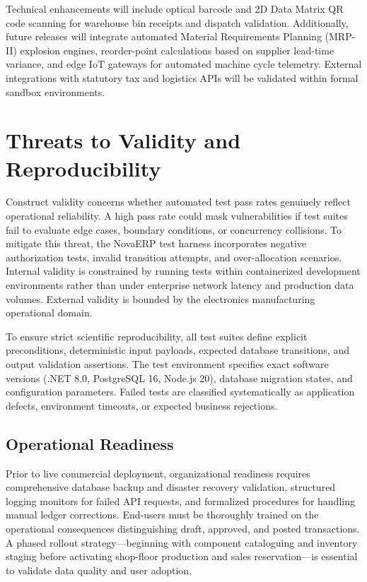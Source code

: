\documentclass[conference]{IEEEtran}
\begin{document}
Technical enhancements will include optical barcode and 2D Data Matrix QR code scanning for warehouse bin receipts and dispatch validation. Additionally, future releases will integrate automated Material Requirements Planning (MRP-II) explosion engines, reorder-point calculations based on supplier lead-time variance, and edge IoT gateways for automated machine cycle telemetry. External integrations with statutory tax and logistics APIs will be validated within formal sandbox environments.

\section{Threats to Validity and Reproducibility}
Construct validity concerns whether automated test pass rates genuinely reflect operational reliability. A high pass rate could mask vulnerabilities if test suites fail to evaluate edge cases, boundary conditions, or concurrency collisions. To mitigate this threat, the NovaERP test harness incorporates negative authorization tests, invalid transition attempts, and over-allocation scenarios. Internal validity is constrained by running tests within containerized development environments rather than under enterprise network latency and production data volumes. External validity is bounded by the electronics manufacturing operational domain.

To ensure strict scientific reproducibility, all test suites define explicit preconditions, deterministic input payloads, expected database transitions, and output validation assertions. The test environment specifies exact software versions (.NET 8.0, PostgreSQL 16, Node.js 20), database migration states, and configuration parameters. Failed tests are classified systematically as application defects, environment timeouts, or expected business rejections.

\subsection{Operational Readiness}
Prior to live commercial deployment, organizational readiness requires comprehensive database backup and disaster recovery validation, structured logging monitors for failed API requests, and formalized procedures for handling manual ledger corrections. End-users must be thoroughly trained on the operational consequences distinguishing draft, approved, and posted transactions. A phased rollout strategy—beginning with component cataloguing and inventory staging before activating shop-floor production and sales reservation—is essential to validate data quality and user adoption.
\end{document}
